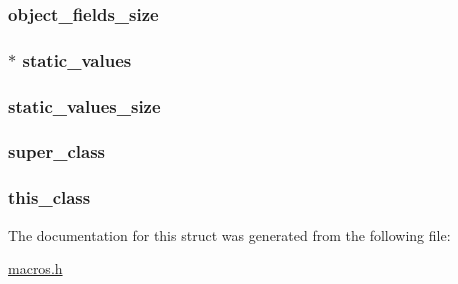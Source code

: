 \subsubsection[{object\+\_\+fields\+\_\+size}]{ object\+\_\+fields\+\_\+size}\label{struct_class_file_aaa9cab196b4abffb17f485b7b0f8f429}
\hypertarget{struct_class_file_a4ae407f89d4076465877f9db6466e98e}{}
\subsubsection[{static\+\_\+values}]{$\ast$ static\+\_\+values}\label{struct_class_file_a4ae407f89d4076465877f9db6466e98e}
\hypertarget{struct_class_file_a1d2ec343ad30ff71132786e288525865}{}
\subsubsection[{static\+\_\+values\+\_\+size}]{ static\+\_\+values\+\_\+size}\label{struct_class_file_a1d2ec343ad30ff71132786e288525865}
\hypertarget{struct_class_file_a85a7fa4c7fd5d455b77e525d952f440f}{}
\subsubsection[{super\+\_\+class}]{ super\+\_\+class}\label{struct_class_file_a85a7fa4c7fd5d455b77e525d952f440f}
\hypertarget{struct_class_file_afd1a9f5d893befc9ea66f915fd6fa039}{}
\subsubsection[{this\+\_\+class}]{ this\+\_\+class}\label{struct_class_file_afd1a9f5d893befc9ea66f915fd6fa039}


The documentation for this struct was generated from the following file\+:\begin{DoxyCompactItemize}
\item 
\hyperlink{macros_8h}{macros.\+h}\end{DoxyCompactItemize}
